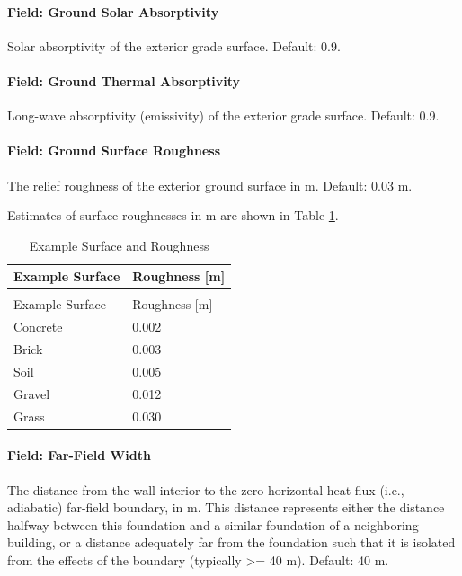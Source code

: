 \paragraph{Field: Ground Solar Absorptivity}\label{foundation-kiva-settings-ground-solar-absorptivity}

Solar absorptivity of the exterior grade surface. Default: 0.9.

\paragraph{Field: Ground Thermal Absorptivity}\label{foundation-kiva-settings-ground-thermal-absorptivity}

Long-wave absorptivity (emissivity) of the exterior grade surface.
Default: 0.9.

\paragraph{Field: Ground Surface Roughness}\label{foundation-kiva-settings-ground-thermal-roughness}

The relief roughness of the exterior ground surface in m. Default: 0.03
m.

Estimates of surface roughnesses in m are shown in Table \ref{table:kiva-example-surface-and-roughness}.

\begin{longtable}[c]{@{}ll@{}}
\caption{Example Surface and Roughness \label{table:kiva-example-surface-and-roughness}} \tabularnewline
\toprule
Example Surface & Roughness {[}m{]} \tabularnewline
\midrule
\endfirsthead

\caption[]{Example Surface and Roughness} \tabularnewline
\toprule
Example Surface & Roughness {[}m{]} \tabularnewline
\midrule
\endhead

Concrete & 0.002 \tabularnewline
Brick & 0.003 \tabularnewline
Soil & 0.005 \tabularnewline
Gravel & 0.012 \tabularnewline
Grass & 0.030 \tabularnewline
\bottomrule
\end{longtable}

\paragraph{Field: Far-Field Width}\label{foundation-kiva-settings-far-field-width}

The distance from the wall interior to the zero horizontal heat flux
(i.e., adiabatic) far-field boundary, in m. This distance represents
either the distance halfway between this foundation and a similar
foundation of a neighboring building, or a distance adequately far from
the foundation such that it is isolated from the effects of the boundary
(typically \textgreater{}= 40 m). Default: 40 m.

